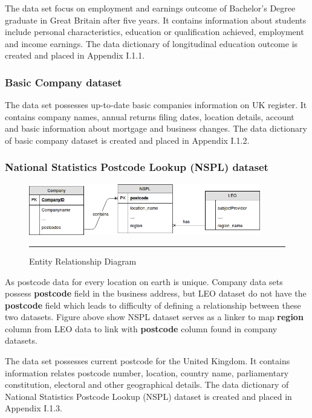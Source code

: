 The data set focus on employment and earnings outcome of Bachelor’s Degree graduate in Great Britain after five years. It contains information about students include personal characteristics, education or qualification achieved, employment and income earnings.  The data dictionary of longitudinal education outcome is created and placed in Appendix I.1.1.

\subsubsection{Basic Company dataset}

The data set possesses up-to-date basic companies information on UK register. It contains company names, annual returns filing dates, location details, account and basic information about mortgage and business changes. The data dictionary of basic company dataset is created and placed in Appendix I.1.2.

\subsubsection{National Statistics Postcode Lookup (NSPL) dataset}

\begin{figure}[H]
	\centering
	\includegraphics[width=0.9\textwidth]{Figure/erd-data.png}
	\rule{35em}{0.5pt}
	\caption[Entity Relationship Diagram]{Entity Relationship Diagram}
\end{figure}

As postcode data for every location on earth is unique. Company data sets possess \textbf{postcode} field in the business address, but LEO dataset do not have the \textbf{postcode} field which leads to difficulty of defining a relationship between these two datasets. Figure above show NSPL dataset serves as a linker to map \textbf{region} column from LEO data to link with \textbf{postcode} column found in company datasets.

The data set possesses current postcode for the United Kingdom. It contains information relates postcode number, location, country name, parliamentary constitution, electoral and other geographical details. The data dictionary of National Statistics Postcode Lookup (NSPL) dataset is created and placed in Appendix I.1.3.



